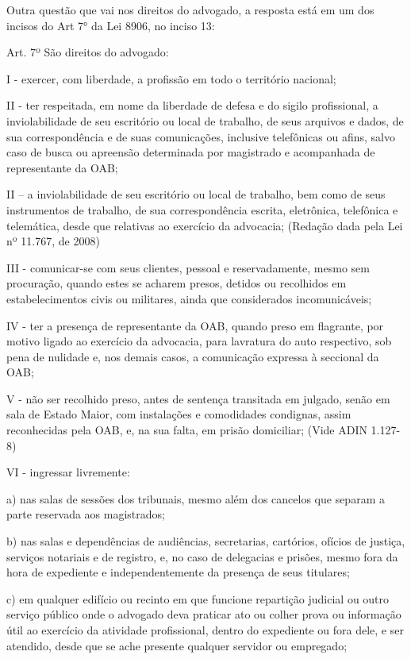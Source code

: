\documentclass[12pt]{article}
\begin{document}
Outra questão que vai nos direitos do advogado, a resposta está em um dos incisos do Art 7° da Lei 8906, no inciso 13:

Art. 7º São direitos do advogado:

I - exercer, com liberdade, a profissão em todo o território nacional;

II - ter respeitada, em nome da liberdade de defesa e do sigilo profissional, a inviolabilidade de seu escritório ou local de trabalho, de seus arquivos e dados, de sua correspondência e de suas comunicações, inclusive telefônicas ou afins, salvo caso de busca ou apreensão determinada por magistrado e acompanhada de representante da OAB;

II – a inviolabilidade de seu escritório ou local de trabalho, bem como de seus instrumentos de trabalho, de sua correspondência escrita, eletrônica, telefônica e telemática, desde que relativas ao exercício da advocacia; (Redação dada pela Lei nº 11.767, de 2008)

III - comunicar-se com seus clientes, pessoal e reservadamente, mesmo sem procuração, quando estes se acharem presos, detidos ou recolhidos em estabelecimentos civis ou militares, ainda que considerados incomunicáveis;

IV - ter a presença de representante da OAB, quando preso em flagrante, por motivo ligado ao exercício da advocacia, para lavratura do auto respectivo, sob pena de nulidade e, nos demais casos, a comunicação expressa à seccional da OAB;

V - não ser recolhido preso, antes de sentença transitada em julgado, senão em sala de Estado Maior, com instalações e comodidades condignas, assim reconhecidas pela OAB, e, na sua falta, em prisão domiciliar;         (Vide ADIN 1.127-8)

VI - ingressar livremente:

a) nas salas de sessões dos tribunais, mesmo além dos cancelos que separam a parte reservada aos magistrados;

b) nas salas e dependências de audiências, secretarias, cartórios, ofícios de justiça, serviços notariais e de registro, e, no caso de delegacias e prisões, mesmo fora da hora de expediente e independentemente da presença de seus titulares;

c) em qualquer edifício ou recinto em que funcione repartição judicial ou outro serviço público onde o advogado deva praticar ato ou colher prova ou informação útil ao exercício da atividade profissional, dentro do expediente ou fora dele, e ser atendido, desde que se ache presente qualquer servidor ou empregado;
\end{document}
